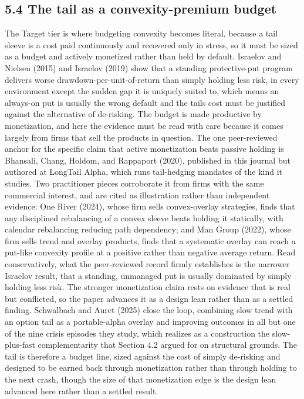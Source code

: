 \documentclass[12pt, a4paper]{article}
\begin{document}
\subsection*{5.4 The tail as a convexity-premium
budget}\label{the-tail-as-a-convexity-premium-budget}

The Target tier is where budgeting convexity becomes literal, because a
tail sleeve is a cost paid continuously and recovered only in stress, so
it must be sized as a budget and actively monetized rather than held by
default. Israelov and Nielsen (2015) and Israelov (2019) show that a
standing protective-put program delivers worse
drawdown-per-unit-of-return than simply holding less risk, in every
environment except the sudden gap it is uniquely suited to, which means
an always-on put is usually the wrong default and the
tail\textquotesingle s cost must be justified against the alternative of
de-risking. The budget is made productive by monetization, and here the
evidence must be read with care because it comes largely from firms that
sell the products in question. The one peer-reviewed anchor for the
specific claim that active monetization beats passive holding is
Bhansali, Chang, Holdom, and Rappaport (2020), published in this journal
but authored at LongTail Alpha, which runs tail-hedging mandates of the
kind it studies. Two practitioner pieces corroborate it from firms with
the same commercial interest, and are cited as illustration rather than
independent evidence: One River (2024), whose firm sells convex-overlay
strategies, finds that any disciplined rebalancing of a convex sleeve
beats holding it statically, with calendar rebalancing reducing path
dependency; and Man Group (2022), whose firm sells trend and overlay
products, finds that a systematic overlay can reach a put-like convexity
profile at a positive rather than negative average return. Read
conservatively, what the peer-reviewed record firmly establishes is the
narrower Israelov result, that a standing, unmanaged put is usually
dominated by simply holding less risk. The stronger monetization claim
rests on evidence that is real but conflicted, so the paper advances it
as a design lean rather than as a settled finding. Schwalbach and Auret
(2025) close the loop, combining slow trend with an option tail as a
portable-alpha overlay and improving outcomes in all but one of the nine
crisis episodes they study, which realizes as a construction the
slow-plus-fast complementarity that Section 4.2 argued for on structural
grounds. The tail is therefore a budget line, sized against the cost of
simply de-risking and designed to be earned back through monetization
rather than through holding to the next crash, though the size of that
monetization edge is the design lean advanced here rather than a settled
result.
\end{document}
